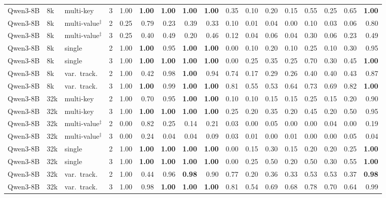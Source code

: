 \begin{tabular}{@{}llllrrrrrrrrrrrrr@{}}
Qwen3-8B & 8k & multi-key & 3 & 1.00 & \textbf{1.00} & \textbf{1.00} & \textbf{1.00} & \textbf{1.00} & 0.35 & 0.10 & 0.20 & 0.15 & 0.55 & 0.25 & 0.65 & \textbf{1.00} \\
Qwen3-8B & 8k & multi-value$^\ddagger$ & 2 & 0.25 & 0.79 & 0.23 & 0.39 & 0.33 & 0.10 & 0.01 & 0.04 & 0.00 & 0.10 & 0.03 & 0.06 & 0.80 \\
Qwen3-8B & 8k & multi-value$^\ddagger$ & 3 & 0.25 & 0.40 & 0.49 & 0.20 & 0.46 & 0.12 & 0.04 & 0.06 & 0.04 & 0.30 & 0.06 & 0.23 & 0.49 \\
Qwen3-8B & 8k & single & 2 & 1.00 & \textbf{1.00} & 0.95 & \textbf{1.00} & \textbf{1.00} & 0.00 & 0.10 & 0.20 & 0.10 & 0.25 & 0.10 & 0.30 & 0.95 \\
Qwen3-8B & 8k & single & 3 & 1.00 & \textbf{1.00} & \textbf{1.00} & \textbf{1.00} & \textbf{1.00} & 0.00 & 0.25 & 0.35 & 0.25 & 0.70 & 0.30 & 0.45 & \textbf{1.00} \\
Qwen3-8B & 8k & var.\ track. & 2 & 1.00 & 0.42 & 0.98 & \textbf{1.00} & 0.94 & 0.74 & 0.17 & 0.29 & 0.26 & 0.40 & 0.40 & 0.43 & 0.87 \\
Qwen3-8B & 8k & var.\ track. & 3 & 1.00 & \textbf{1.00} & 0.99 & \textbf{1.00} & \textbf{1.00} & 0.81 & 0.55 & 0.53 & 0.64 & 0.73 & 0.69 & 0.82 & \textbf{1.00} \\
\addlinespace[1pt]
Qwen3-8B & 32k & multi-key & 2 & 1.00 & 0.70 & 0.95 & \textbf{1.00} & \textbf{1.00} & 0.10 & 0.10 & 0.15 & 0.15 & 0.25 & 0.15 & 0.20 & 0.90 \\
Qwen3-8B & 32k & multi-key & 3 & 1.00 & \textbf{1.00} & \textbf{1.00} & \textbf{1.00} & \textbf{1.00} & 0.25 & 0.20 & 0.35 & 0.20 & 0.45 & 0.20 & 0.50 & 0.95 \\
Qwen3-8B & 32k & multi-value$^\ddagger$ & 2 & 0.00 & 0.82 & 0.25 & 0.14 & 0.21 & 0.03 & 0.00 & 0.05 & 0.00 & 0.00 & 0.04 & 0.00 & 0.19 \\
Qwen3-8B & 32k & multi-value$^\ddagger$ & 3 & 0.00 & 0.24 & 0.04 & 0.04 & 0.09 & 0.03 & 0.01 & 0.00 & 0.01 & 0.00 & 0.00 & 0.05 & 0.04 \\
Qwen3-8B & 32k & single & 2 & 1.00 & \textbf{1.00} & \textbf{1.00} & \textbf{1.00} & \textbf{1.00} & 0.00 & 0.15 & 0.30 & 0.15 & 0.20 & 0.20 & 0.25 & \textbf{1.00} \\
Qwen3-8B & 32k & single & 3 & 1.00 & \textbf{1.00} & \textbf{1.00} & \textbf{1.00} & \textbf{1.00} & 0.00 & 0.25 & 0.50 & 0.20 & 0.50 & 0.30 & 0.55 & \textbf{1.00} \\
Qwen3-8B & 32k & var.\ track. & 2 & 1.00 & 0.44 & 0.96 & \textbf{0.98} & 0.90 & 0.77 & 0.20 & 0.36 & 0.33 & 0.53 & 0.53 & 0.37 & \textbf{0.98} \\
Qwen3-8B & 32k & var.\ track. & 3 & 1.00 & 0.98 & \textbf{1.00} & \textbf{1.00} & \textbf{1.00} & 0.81 & 0.54 & 0.69 & 0.68 & 0.78 & 0.70 & 0.64 & 0.99 \\
\bottomrule
\end{tabular}

